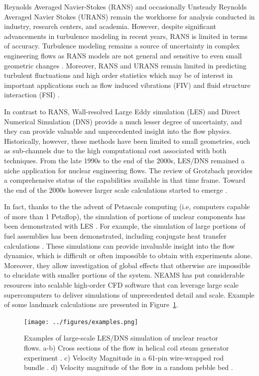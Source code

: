 \documentclass[11pt,letterpaper,english]{article}
\begin{document}
Reynolds Averaged Navier-Stokes (RANS) \cite{conner2010cfd} and occasionally Unsteady Reynolds Averaged Navier Stokes (URANS) remain the workhorse for analysis conducted in industry, research centers, and academia.  However, despite significant advancements in turbulence modeling in recent years, RANS is limited in terms of accuracy. Turbulence modeling remains a source of uncertainty in complex engineering flows as RANS models are not general and sensitive to even small geometric changes \cite{merzari2010numerical}. Moreover, RANS and URANS remain limited in predicting turbulent fluctuations and high order statistics which may be of interest in important applications such as flow induced vibrations (FIV) and fluid structure interaction (FSI) \cite{yuan2017flow}.

In contrast to RANS, Wall-resolved Large Eddy simulation (LES) and Direct Numerical Simulation (DNS) provide a much lesser degree of uncertainty, and they can provide valuable and unprecedented insight into the flow physics. Historically, however, these methods have been limited to small geometries, such as sub-channels \cite{grotzbach1999direct} due to the high computational cost associated with both techniques. From the late 1990s to the end of the 2000s, LES/DNS remained a niche application for nuclear engineering flows. The review of Grotzbach \cite{grotzbach1999direct} provides a comprehensive status of the capabilities available in that time frame. Toward the end of the 2000s however larger scale calculations started to emerge \cite{pointer2009simulations}.

In fact, thanks to the the advent of Petascale computing (i.e, computers capable of more than 1 Petaflop), the simulation of portions of nuclear components has been demonstrated with LES \cite{merzari2017large}. For example, the simulation of large portions of fuel assemblies has been demonstrated, including conjugate heat transfer calculations \cite{obabko2019}. These simulations can provide invaluable insight into the flow dynamics, which is difficult or often impossible to obtain with experiments alone. Moreover, they allow investigation of global effects that otherwise are impossible to elucidate with smaller portions of the system. NEAMS has put considerable resources into scalable high-order CFD software that can leverage large scale supercomputers to deliver simulations of unprecedented detail and scale. Example of some landmark calculations are presented in Figure~\ref{f:examples}.

\begin{figure}[!ht]
\centering
\texttt{[image: ../figures/examples.png]}
\caption{Examples of large-scale LES/DNS simulation of nuclear reactor flows. a-b) Cross sections of the flow in helical coil steam generator experiment \cite{alper2018}. c) Velocity Magnitude in a 61-pin wire-wrapped rod bundle \cite{goth2018comparison}. d) Velocity magnitude of the flow in a random pebble bed \cite{yuan2019}.}
\label{f:examples}
\end{figure}
\end{document}
